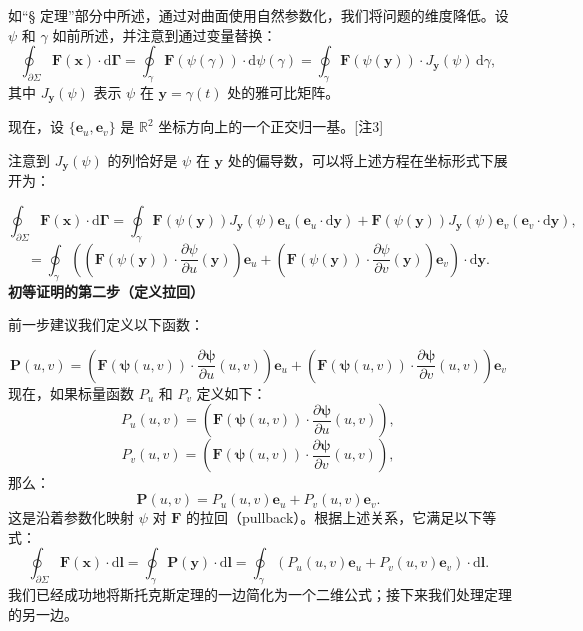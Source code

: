 如“§ 定理”部分中所述，通过对曲面使用自然参数化，我们将问题的维度降低。设 \(\psi\) 和 \(\gamma\) 如前所述，并注意到通过变量替换：
\[
\oint_{\partial \Sigma} \mathbf{F}(\mathbf{x}) \cdot \mathrm{d} \mathbf{\Gamma} 
= \oint_{\gamma} \mathbf{F}(\psi(\gamma)) \cdot \mathrm{d} \psi(\gamma) 
= \oint_{\gamma} \mathbf{F}(\psi(\mathbf{y})) \cdot J_{\mathbf{y}}(\psi) \, \mathrm{d} \gamma,~
\]
其中 \(J_{\mathbf{y}}(\psi)\) 表示 \(\psi\) 在 \(\mathbf{y} = \gamma(t)\) 处的雅可比矩阵。

现在，设 \(\{ \mathbf{e}_u, \mathbf{e}_v \}\) 是 \(\mathbb{R}^2\) 坐标方向上的一个正交归一基。[注3]

注意到 \(J_{\mathbf{y}}(\psi)\) 的列恰好是 \(\psi\) 在 \(\mathbf{y}\) 处的偏导数，可以将上述方程在坐标形式下展开为：

\[
\oint_{\partial \Sigma} \mathbf{F}(\mathbf{x}) \cdot \mathrm{d} \mathbf{\Gamma} 
= \oint_{\gamma} \mathbf{F}(\psi(\mathbf{y})) J_{\mathbf{y}}(\psi) \mathbf{e}_u (\mathbf{e}_u \cdot \mathrm{d} \mathbf{y}) 
+ \mathbf{F}(\psi(\mathbf{y})) J_{\mathbf{y}}(\psi) \mathbf{e}_v (\mathbf{e}_v \cdot \mathrm{d} \mathbf{y}),~
\]
\[
=\oint_{\gamma} \left( 
\left( \mathbf{F}(\psi(\mathbf{y})) \cdot \frac{\partial \psi}{\partial u}(\mathbf{y}) \right) \mathbf{e}_u 
+ \left( \mathbf{F}(\psi(\mathbf{y})) \cdot \frac{\partial \psi}{\partial v}(\mathbf{y}) \right) \mathbf{e}_v 
\right) \cdot \mathrm{d} \mathbf{y}.~
\]
\textbf{初等证明的第二步（定义拉回）}

前一步建议我们定义以下函数：

\[
\mathbf{P}(u, v) = \left( \mathbf{F}(\boldsymbol{\psi}(u, v)) \cdot \frac{\partial \boldsymbol{\psi}}{\partial u}(u, v) \right) \mathbf{e}_u + \left( \mathbf{F}(\boldsymbol{\psi}(u, v)) \cdot \frac{\partial \boldsymbol{\psi}}{\partial v}(u, v) \right) \mathbf{e}_v~
\]
现在，如果标量函数 \(P_u\) 和 \(P_v\) 定义如下：
\[
P_u(u, v) = \left( \mathbf{F}(\boldsymbol{\psi}(u, v)) \cdot \frac{\partial \boldsymbol{\psi}}{\partial u}(u, v) \right),~
\]
\[
P_v(u, v) = \left( \mathbf{F}(\boldsymbol{\psi}(u, v)) \cdot \frac{\partial \boldsymbol{\psi}}{\partial v}(u, v) \right),~
\]
那么：
\[
\mathbf{P}(u, v) = P_u(u, v) \mathbf{e}_u + P_v(u, v) \mathbf{e}_v.~
\]
这是沿着参数化映射 \(\psi\) 对 \(\mathbf{F}\) 的拉回（pullback）。根据上述关系，它满足以下等式：
\[
\oint_{\partial \Sigma} \mathbf{F}(\mathbf{x}) \cdot \mathrm{d} \mathbf{l} 
= \oint_{\gamma} \mathbf{P}(\mathbf{y}) \cdot \mathrm{d} \mathbf{l} 
= \oint_{\gamma} \left( P_u(u, v) \mathbf{e}_u + P_v(u, v) \mathbf{e}_v \right) \cdot \mathrm{d} \mathbf{l}.~
\]
我们已经成功地将斯托克斯定理的一边简化为一个二维公式；接下来我们处理定理的另一边。